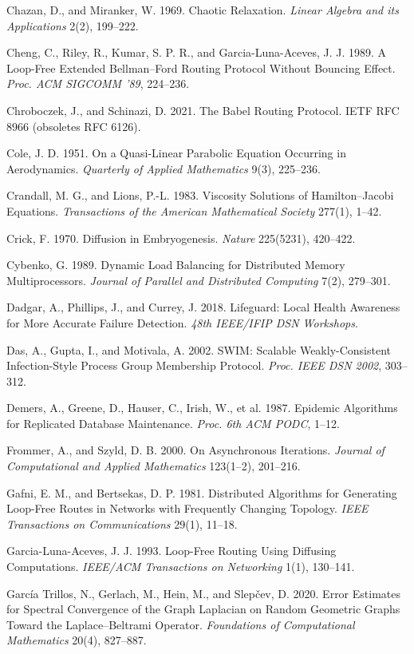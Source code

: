 \documentclass[11pt]{article}
\theoremstyle{plain}
\numberwithin{equation}{section}
\begin{document}
Chazan, D., and Miranker, W. 1969. Chaotic Relaxation. \emph{Linear Algebra and its Applications} 2(2), 199–222.

Cheng, C., Riley, R., Kumar, S. P. R., and Garcia-Luna-Aceves, J. J. 1989. A Loop-Free Extended Bellman–Ford Routing Protocol Without Bouncing Effect. \emph{Proc. ACM SIGCOMM '89}, 224–236.

Chroboczek, J., and Schinazi, D. 2021. The Babel Routing Protocol. IETF RFC 8966 (obsoletes RFC 6126).

Cole, J. D. 1951. On a Quasi-Linear Parabolic Equation Occurring in Aerodynamics. \emph{Quarterly of Applied Mathematics} 9(3), 225–236.

Crandall, M. G., and Lions, P.-L. 1983. Viscosity Solutions of Hamilton–Jacobi Equations. \emph{Transactions of the American Mathematical Society} 277(1), 1–42.

Crick, F. 1970. Diffusion in Embryogenesis. \emph{Nature} 225(5231), 420–422.

Cybenko, G. 1989. Dynamic Load Balancing for Distributed Memory Multiprocessors. \emph{Journal of Parallel and Distributed Computing} 7(2), 279–301.

Dadgar, A., Phillips, J., and Currey, J. 2018. Lifeguard: Local Health Awareness for More Accurate Failure Detection. \emph{48th IEEE/IFIP DSN Workshops}.

Das, A., Gupta, I., and Motivala, A. 2002. SWIM: Scalable Weakly-Consistent Infection-Style Process Group Membership Protocol. \emph{Proc. IEEE DSN 2002}, 303–312.

Demers, A., Greene, D., Hauser, C., Irish, W., et al. 1987. Epidemic Algorithms for Replicated Database Maintenance. \emph{Proc. 6th ACM PODC}, 1–12.

Frommer, A., and Szyld, D. B. 2000. On Asynchronous Iterations. \emph{Journal of Computational and Applied Mathematics} 123(1–2), 201–216.

Gafni, E. M., and Bertsekas, D. P. 1981. Distributed Algorithms for Generating Loop-Free Routes in Networks with Frequently Changing Topology. \emph{IEEE Transactions on Communications} 29(1), 11–18.

Garcia-Luna-Aceves, J. J. 1993. Loop-Free Routing Using Diffusing Computations. \emph{IEEE/ACM Transactions on Networking} 1(1), 130–141.

García Trillos, N., Gerlach, M., Hein, M., and Slepčev, D. 2020. Error Estimates for Spectral Convergence of the Graph Laplacian on Random Geometric Graphs Toward the Laplace–Beltrami Operator. \emph{Foundations of Computational Mathematics} 20(4), 827–887.
\end{document}
